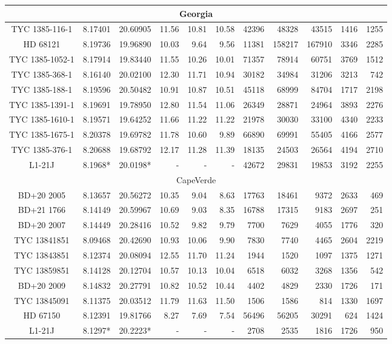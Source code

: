 \begin{table*}
{\begin{tabular}{c|cc|rrr|rrr|rr}
\hline
\multicolumn{11}{c}{Georgia}\\
\hline
TYC 1385-116-1 & 8.17401 & 20.60905 & 11.56 & 10.81 & 10.58 & 42396 & 48328 & 43515 & 1416 & 1255\\
HD 68121 & 8.19736 & 19.96890 & 10.03 & 9.64 & 9.56 & 11381 & 158217 & 167910 & 3346 & 2285\\
TYC 1385-1052-1 & 8.17914 & 19.83440 & 11.55 & 10.26 & 10.01 & 71357 & 78914 & 60751 & 3769 & 1512\\
TYC 1385-368-1 & 8.16140 & 20.02100 & 12.30 & 11.71 & 10.94 & 30182 & 34984 & 31206 & 3213 & 742\\
TYC 1385-188-1 & 8.19596 & 20.50482 & 10.91 & 10.87 & 10.51 & 45118 & 68999 & 84704 & 1717 & 2198\\
TYC 1385-1391-1 & 8.19691 & 19.78950 & 12.80 & 11.54 & 11.06 & 26349 & 28871 & 24964 & 3893 & 2276\\
TYC 1385-1610-1 & 8.19571 & 19.64252 & 11.66 & 11.22 & 11.22 & 21978 & 30030 & 33100 & 4340 & 2233\\
TYC 1385-1675-1 & 8.20378 & 19.69782 & 11.78 & 10.60 & 9.89 & 66890 & 69991 & 55405 & 4166 & 2577\\
TYC 1385-376-1 & 8.20688 & 19.68792 & 12.17 & 11.28 & 11.39 & 18135 & 24503 & 26564 & 4194 & 2710\\
L1-21J & 8.1968* & 20.0198* & - & - & - & 42672 & 29831 & 19853 & 3192 & 2255\\

\hline
\multicolumn{11}{c}{CapeVerde}\\
\hline
BD+20 2005 & 8.13657 & 20.56272 & 10.35 & 9.04 & 8.63 & 17763 & 18461 & 9372 & 2633 & 469\\
BD+21 1766 & 8.14149 & 20.59967 & 10.69 & 9.03 & 8.35 & 16788 & 17315 & 9183 & 2697 & 251\\
BD+20 2007 & 8.14449 & 20.28416 & 10.52 & 9.82 & 9.79 & 7700 & 7629 & 4055 & 1776 & 320\\
TYC 13841851 & 8.09468 & 20.42690 & 10.93 & 10.06 & 9.90 & 7830 & 7740 & 4465 & 2604 & 2219\\
TYC 13843851 & 8.12374 & 20.08094 & 12.55 & 11.70 & 11.24 & 1944 & 1520 & 1097 & 1375 & 1271\\
TYC 13859851 & 8.14128 & 20.12704 & 10.57 & 10.13 & 10.04 & 6518 & 6032 & 3268 & 1356 & 542\\
BD+20 2009 & 8.14832 & 20.27791 & 10.82 & 10.52 & 10.44 & 4402 & 4829 & 2330 & 1726 & 171\\
TYC 13845091 & 8.11375 & 20.03512 & 11.79 & 11.63 & 11.50 & 1506 & 1586 & 814 & 1330 & 1697\\
HD 67150 & 8.12391 & 19.81766 & 8.27 & 7.69 & 7.54 & 56496 & 56205 & 30291 & 624 & 1424\\
L1-21J & 8.1297* & 20.2223* & - & - & - & 2708 & 2535 & 1816 & 1726 & 950\\


\end{tabular}}
\end{table*}
